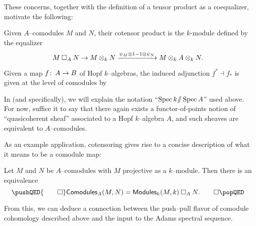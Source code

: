 These concerns, together with the definition of a tensor product as a coequalizer, motivate the following:

\begin{definition}
Given $A$--comodules $M$ and $N$, their cotensor product is the $k$-module defined by the equalizer \[M \mathbin\square_A N \to M \otimes_k N \xrightarrow{\psi_M \otimes 1 - 1 \otimes \psi_N} M \otimes_k A \otimes_k N.\]
\end{definition}

\begin{lemma}
Given a map $f \colon\thinspace A \to B$ of Hopf $k$--algebras, the induced adjunction $f^* \dashv f_*$ is given at the level of comodules by
\begin{center}
\end{center}
\end{lemma}

\begin{remark}
In  (and  specifically), we will explain the notation ``$\operatorname{Spec} k /\!\!/ \operatorname{Spec} A$'' used above.  For now, suffice it to say that there again exists a functor-of-points notion of ``quasicoherent sheaf'' associated to a Hopf $k$--algebra $A$, and such sheaves are equivalent to $A$--comodules.
\end{remark}

As an example application, cotensoring gives rise to a concise description of what it means to be a comodule map:

\begin{lemma}
Let $M$ and $N$ be $A$--comodules with $M$ projective as a $k$--module.  Then there is an equivalence
\[\pushQED{\qed}
\CatOf{Comodules}_A(M, N) = \CatOf{Modules}_k(M, k) \cotensor_A N.\qedhere
\popQED
\]
\end{lemma}

\noindent From this, we can deduce a connection between the push--pull flavor of comodule cohomology described above and the input to the Adams spectral sequence.

